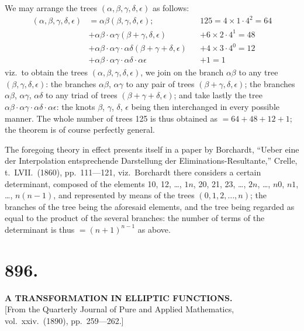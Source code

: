 \documentclass[11pt,a4paper]{article}
\begin{document}
We may arrange the trees $(\alpha, \beta, \gamma, \delta, \epsilon)$ as follows:
\begin{align*}
(\alpha, \beta, \gamma, \delta, \epsilon) &= \alpha\beta(\beta, \gamma, \delta, \epsilon); && 125 = 4 \times 1 \cdot 4^2 = 64 \\
&+ \alpha\beta \cdot \alpha\gamma(\beta + \gamma, \delta, \epsilon) && + 6 \times 2 \cdot 4^1 = 48 \\
&+ \alpha\beta \cdot \alpha\gamma \cdot \alpha\delta(\beta + \gamma + \delta, \epsilon) && + 4 \times 3 \cdot 4^0 = 12 \\
&+ \alpha\beta \cdot \alpha\gamma \cdot \alpha\delta \cdot \alpha\epsilon && + 1 = 1
\end{align*}
viz.\ to obtain the trees $(\alpha, \beta, \gamma, \delta, \epsilon)$, we join on the branch $\alpha\beta$ to any tree $(\beta, \gamma, \delta, \epsilon)$: the branches $\alpha\beta$, $\alpha\gamma$ to any pair of trees $(\beta + \gamma, \delta, \epsilon)$; the branches $\alpha\beta$, $\alpha\gamma$, $\alpha\delta$ to any triad of trees $(\beta + \gamma + \delta, \epsilon)$; and take lastly the tree $\alpha\beta \cdot \alpha\gamma \cdot \alpha\delta \cdot \alpha\epsilon$: the knots $\beta$, $\gamma$, $\delta$, $\epsilon$ being then interchanged in every possible manner. The whole number of trees 125 is thus obtained as $= 64 + 48 + 12 + 1$; the theorem is of course perfectly general.

The foregoing theory in effect presents itself in a paper by Borchardt, ``Ueber eine der Interpolation entsprechende Darstellung der Eliminations-Resultante,'' Crelle, t.\ LVII.\ (1860), pp.\ 111---121, viz.\ Borchardt there considers a certain determinant, composed of the elements 10, 12, \ldots, $1n$, 20, 21, 23, \ldots, $2n$, \ldots, $n0$, $n1$, \ldots, $n(n-1)$, and represented by means of the trees $(0, 1, 2, \ldots, n)$; the branches of the tree being the aforesaid elements, and the tree being regarded as equal to the product of the several branches: the number of terms of the determinant is thus $= (n+1)^{n-1}$ as above.


\section*{896.}
\begin{center}
{\large\bfseries A TRANSFORMATION IN ELLIPTIC FUNCTIONS.}\\[0.5em]
\small [From the Quarterly Journal of Pure and Applied Mathematics, vol.\ xxiv.\ (1890), pp.\ 259---262.]
\end{center}
\end{document}
